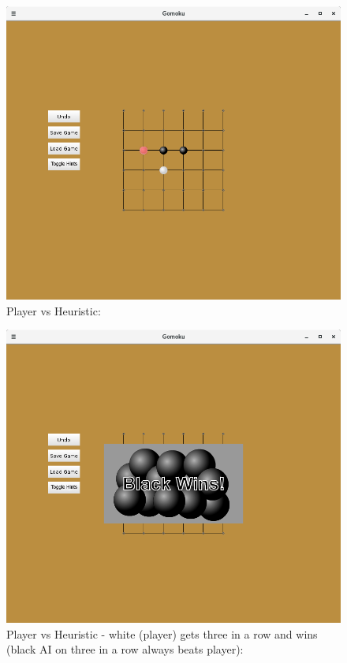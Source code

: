 \documentclass[11]{article}
\begin{document}
\begin{figure}[h]
					\caption{Player vs Heuristic:}				\centering
					\includegraphics[scale=0.5]{Heuristic3.png}
\end{figure}

\begin{figure}[h]
					\caption{Player vs Heuristic - white (player) gets three in a row and wins (black AI on three in a row always beats player):}				\centering
					\includegraphics[scale=0.5]{Heuristic4.png}
\end{figure}
\end{document}
